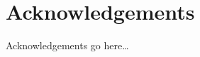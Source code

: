 \chapter*{Acknowledgements} %
\label{cha:acknowledgements}
\mtcaddchapter[Acknowledgements]

Acknowledgements go here\ldots

